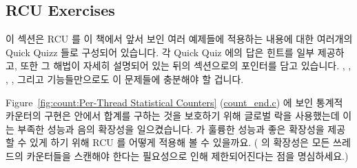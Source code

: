 
\subsection{RCU Exercises}
\label{sec:defer:RCU Exercises}

이 섹션은 RCU 를 이 책에서 앞서 보인 여러 예제들에 적용하는 내용에 대한
여러개의 Quick Quizz 들로 구성되어 있습니다.
각 Quick Quiz 에의 답은 힌트를 일부 제공하고, 또한 그 해법이 자세히 설명되어
있는 뒤의 섹션으로의 포인터를 담고 있습니다.
, , ,
, 그리고  기능들만으로도 이
문제들에 충분해야 할 겁니다.
\iffalse

This section is organized as a series of Quick Quizzes that invite you
to apply RCU to a number of examples earlier in this book.
The answer to each Quick Quiz gives some hints, and also contains a
pointer to a later section where the solution is explained at length.
The \co{rcu_read_lock()}, \co{rcu_read_unlock()}, \co{rcu_dereference()},
\co{rcu_assign_pointer()}, and \co{synchronize_rcu()} primitives should
suffice for most of these exercises.
\fi

\QuickQuiz{}
	Figure~\ref{fig:count:Per-Thread Statistical Counters}
	(\url{count_end.c})
	에 보인 통계적 카운터의 구현은  안에서 합계를 구하는
	것을 보호하기 위해 글로벌 락을 사용했는데 이는 부족한 성능과 음의
	확장성을 일으켰습니다.
	 가 훌륭한 성능과 좋은 확장성을 제공할 수 있게 하기
	위해 RCU 를 어떻게 적용해 볼 수 있을까요.
	( 의 확장성은 모든 쓰레드의 카운터들을 스캔해야 한다는
	필요성으로 인해 제한되어진다는 점을 명심하세요.)
	\iffalse

